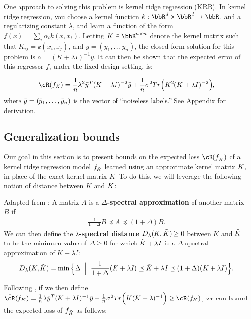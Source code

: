 One approach to solving this problem is kernel ridge regression (KRR).  In kernel ridge regression, you choose a kernel function $k:\RR^d\times\RR^d\rightarrow \RR$, and a regularizing constant $\lambda$, and learn a function of the form $f(x) = \sum_i \alpha_i k(x,x_i)$.  Letting $K\in\RR^{n\times n}$ denote the kernel matrix such that $K_{ij} = k(x_i,x_j)$, and $y = (y_1,\ldots,y_n)$, the closed form solution for this problem is $\alpha = (K+\lambda I)^{-1}y$. It can then be shown that the expected error of this regressor $f$, under the fixed design setting, is:

\begin{eqnarray}
\cR(f_K) = \frac{1}{n}\lambda^2 \by^T(K+\lambda I)^{-2}\by + \frac{1}{n}\sigma^2 Tr\Big(K^2(K+\lambda \id)^{-2}\Big),
\end{eqnarray}
where $\bar{y} = (\bar{y}_1,\ldots,\bar{y}_n)$ is the vector of ``noiseless labels.'' See Appendix  for derivation.

\subsection{Generalization bounds}
Our goal in this section is to present bounds on the expected loss $\cR(f_{\tK})$ of a kernel ridge regression model $f_{\tilde{K}}$ learned using an approximate kernel matrix $\tilde{K}$, in place of the exact kernel matrix $K$. To do this, we will leverage the following notion of distance between $K$ and $\tilde{K}$:

\begin{definition}{Adapted from \citep{avron17}:}
A matrix $A$ is a \textbf{$\Delta$-spectral approximation} of another matrix $B$ if 
\begin{eqnarray}
\frac{1}{1+\Delta}B \preceq A \preceq (1+\Delta)B.
\end{eqnarray}
We can then define the \textbf{$\lambda$-spectral distance} $D_{\lambda}(K,\tilde{K})\geq 0$ between $K$ and $\tilde{K}$ to be the minimum value of $\Delta \geq 0$ for which $\tilde{K}+\lambda I$ is a $\Delta$-spectral approximation of $K+\lambda I$:
$$D_{\lambda}(K,\tilde{K}) = \min \Big\{\Delta \;\;\Big|\;\; \frac{1}{1+\Delta}(K+\lambda I) \preceq \tilde{K} + \lambda I \preceq (1+\Delta)(K+\lambda I)\Big\}.$$
\end{definition}

Following \citet{avron17}, if we then define $\hcR(f_K) = \frac{1}{n}\lambda \by^T(K+\lambda I)^{-1}\by + \frac{1}{n}\sigma^2 Tr\Big(K(K+\lambda)^{-1}\Big) \geq \cR(f_K)$, we can bound the expected loss of $f_{\tilde{K}}$ as follows:

